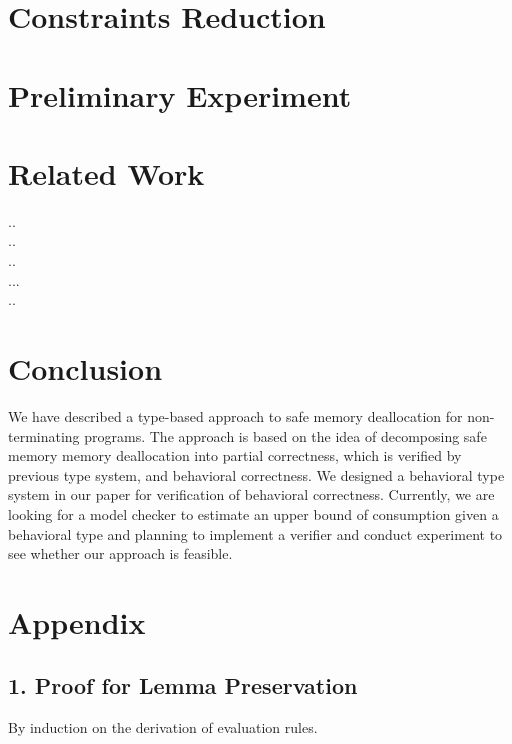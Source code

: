\documentclass[english]{jssst_ppl} %
\theoremstyle{definition}
\begin{document}
\section{Constraints Reduction}

\section{Preliminary Experiment}

\section{Related Work}
\cite{DBLP:conf/sas/OrlovichR06}.. \\
\cite{DBLP:conf/aplas/SuenagaK09}..\\
\cite{DBLP:journals/iandc/MilnerPW92a}..\\
\cite{DBLP:journals/lmcs/KobayashiSW06,DBLP:journals/tcs/IgarashiK04,DBLP:conf/esop/HondaVK98}...\\
\cite{DBLP:conf/aplas/SuenagaK09,DBLP:conf/pldi/HeineL03,DBLP:conf/sigsoft/XieA05,DBLP:journals/scp/SwamyHMGJ06}..\\
\section{Conclusion}
We have described a type-based approach to safe memory deallocation for non-terminating programs. The approach is based on the idea of decomposing safe memory memory deallocation into partial correctness, which is verified by previous type system, and behavioral correctness. We designed a behavioral type system in our paper for verification of behavioral correctness. Currently, we are looking for a model checker to estimate an upper bound of consumption given a behavioral type and planning to implement a verifier and conduct experiment to see whether our approach is feasible.




\newpage
\appendix
\section*{Appendix}
\subsection*{1. Proof for Lemma Preservation}

By induction on the derivation of evaluation rules.\\
\end{document}
